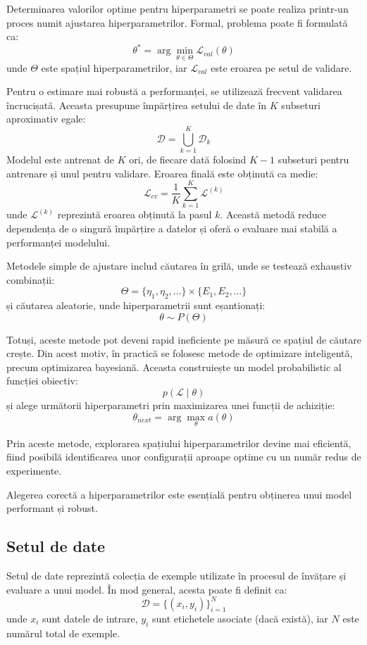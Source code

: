 Determinarea valorilor optime pentru hiperparametri se poate realiza printr-un proces numit ajustarea hiperparametrilor. Formal, problema poate fi formulată ca:
\[
\theta^* = \arg\min_{\theta \in \Theta} \mathcal{L}_{val}(\theta)
\]
unde \( \Theta \) este spațiul hiperparametrilor, iar \( \mathcal{L}_{val} \) este eroarea pe setul de validare.

Pentru o estimare mai robustă a performanței, se utilizează frecvent validarea încrucișată. Aceasta presupune împărțirea setului de date în \( K \) subseturi aproximativ egale:
\[
\mathcal{D} = \bigcup_{k=1}^{K} \mathcal{D}_k
\]
Modelul este antrenat de \( K \) ori, de fiecare dată folosind \( K-1 \) subseturi pentru antrenare și unul pentru validare. Eroarea finală este obținută ca medie:
\[
\mathcal{L}_{cv} = \frac{1}{K} \sum_{k=1}^{K} \mathcal{L}^{(k)}
\]
unde \( \mathcal{L}^{(k)} \) reprezintă eroarea obținută la pasul \( k \). Această metodă reduce dependența de o singură împărțire a datelor și oferă o evaluare mai stabilă a performanței modelului.

Metodele simple de ajustare includ căutarea în grilă, unde se testează exhaustiv combinații:
\[
\Theta = \{\eta_1, \eta_2, \ldots\} \times \{E_1, E_2, \ldots\}
\]
și căutarea aleatorie, unde hiperparametrii sunt eșantionați:
\[
\theta \sim P(\Theta)
\]

Totuși, aceste metode pot deveni rapid ineficiente pe măsură ce spațiul de căutare crește. Din acest motiv, în practică se folosesc metode de optimizare inteligentă, precum optimizarea bayesiană. Aceasta construiește un model probabilistic al funcției obiectiv:
\[
p(\mathcal{L} \mid \theta)
\]
și alege următorii hiperparametri prin maximizarea unei funcții de achiziție:
\[
\theta_{next} = \arg\max_{\theta} a(\theta)
\]

Prin aceste metode, explorarea spațiului hiperparametrilor devine mai eficientă, fiind posibilă identificarea unor configurații aproape optime cu un număr redus de experimente.

Alegerea corectă a hiperparametrilor este esențială pentru obținerea unui model performant și robust.

\subsection*{Setul de date}

Setul de date reprezintă colecția de exemple utilizate în procesul de învățare și evaluare a unui model. În mod general, acesta poate fi definit ca:
\[
    \mathcal{D} = \{(x_i, y_i)\}_{i=1}^{N}
\]
unde \(x_i\) sunt datele de intrare, \(y_i\) sunt etichetele asociate (dacă există), iar \(N\) este numărul total de exemple.

